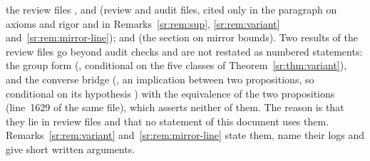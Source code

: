 the review files ,  and
 (review and audit files, cited only in the paragraph on axioms and rigor and in
Remarks~\ref{sr:rem:sup}, \ref{sr:rem:variant} and~\ref{sr:rem:mirror-line}); and  (the section
on mirror bounds). Two results of the review files go beyond audit checks and are not restated as numbered
statements: the group form  (, conditional
on the five classes of Theorem~\ref{sr:thm:variant}), and the converse bridge
 (, an implication between
two propositions, so conditional on its hypothesis ) with the equivalence
 of the two propositions (line~1629 of the same file), which asserts
neither of them. The reason is that they lie in review files and that no statement of this document uses them.
Remarks~\ref{sr:rem:variant} and~\ref{sr:rem:mirror-line} state them, name
their logs and give short written arguments.
